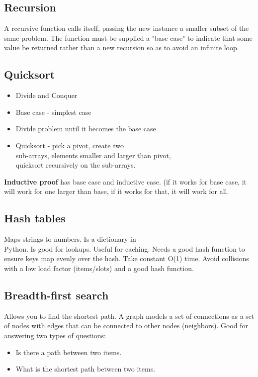\subsection{Recursion}
A recursive function calls itself, passing the new instance a smaller subset of the same problem. The function must be supplied a "base case" to indicate that some value be returned rather than a new recursion so as to avoid an infinite loop.
\subsection{Quicksort}

\begin{itemize}
\item Divide and Conquer
\item Base case - simplest case
\item Divide problem until it becomes the base case
\item Quicksort - pick a pivot, create two \\ sub-arrays, elements smaller and larger than pivot, \\ quicksort recursively on the sub-arrays.
\end{itemize}

\textbf{Inductive proof} has base case and inductive case. (if it works for base case, it will work for one larger than base, if it works for that, it will work for all.

\subsection{Hash tables} Maps strings to numbers. Is a dictionary in \\ Python. Is good for lookups. Useful for caching. Needs a good hash function to ensure keys map evenly over the hash. Take constant O(1) time. Avoid collisions with a low load factor (items/slots) and a good hash function.

\subsection{Breadth-first search} Allows you to find the shortest path. A graph models a set of connections as a set of nodes with edges that can be connected to other nodes (neighbors). Good for answering two types of questions: 

\begin{itemize}
\item Is there a path between two items.
\item What is the shortest path between two items.
\end{itemize}

